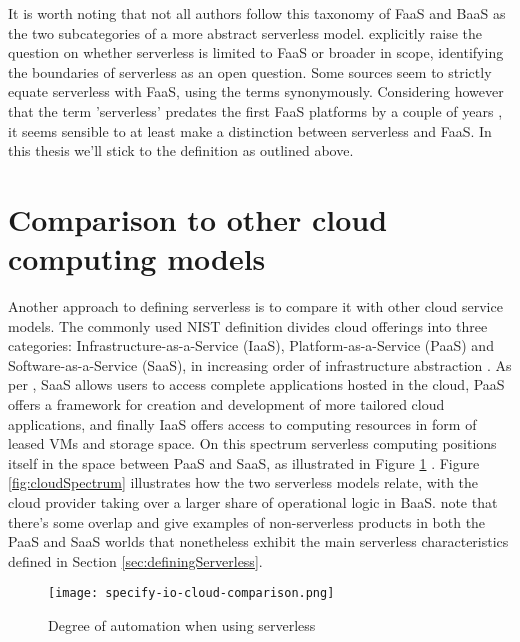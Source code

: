 It is worth noting that not all authors follow this taxonomy of FaaS and BaaS as the two subcategories of a more abstract serverless model. \textcite{baldini17currentTrends} explicitly raise the question on whether serverless is limited to FaaS or broader in scope, identifying the boundaries of serverless as an open question. Some sources \parencite[][among others]{hendrickson16openlambda,mcgrath17implement,varghese18next} seem to strictly equate serverless with FaaS, using the terms synonymously. Considering however that the term 'serverless' predates the first FaaS platforms by a couple of years \parencite{robert2016serverlessarchitectures}, it seems sensible to at least make a distinction between serverless and FaaS. In this thesis we'll stick to the \textcite{cncf18serverlessWG} definition as outlined above.

\section{Comparison to other cloud computing models} \label{sec:comparisonCloud}

Another approach to defining serverless is to compare it with other cloud service models. The commonly used NIST definition divides cloud offerings into three categories: Infrastructure-as-a-Service (IaaS), Platform-as-a-Service (PaaS) and Software-as-a-Service (SaaS), in increasing order of infrastructure abstraction \parencite{nist11definitions}. As per \textcite{buyya2017manifesto}, SaaS allows users to access complete applications hosted in the cloud, PaaS offers a framework for creation and development of more tailored cloud applications, and finally IaaS offers access to computing resources in form of leased VMs and storage space. On this spectrum serverless computing positions itself in the space between PaaS and SaaS, as illustrated in Figure \ref{fig:degreeOfAutomation} \parencite{baldini17currentTrends}. Figure \ref{fig:cloudSpectrum} illustrates how the two serverless models relate, with the cloud provider taking over a larger share of operational logic in BaaS. \textcite{van2017spec} note that there's some overlap and give examples of non-serverless products in both the PaaS and SaaS worlds that nonetheless exhibit the main serverless characteristics defined in Section \ref{sec:definingServerless}.

\begin{figure}[h]
  \centering
  \texttt{[image: specify-io-cloud-comparison.png]}
  \caption{Degree of automation when using serverless \parencite{wolf16serverless}}
  \label{fig:degreeOfAutomation}
\end{figure}

